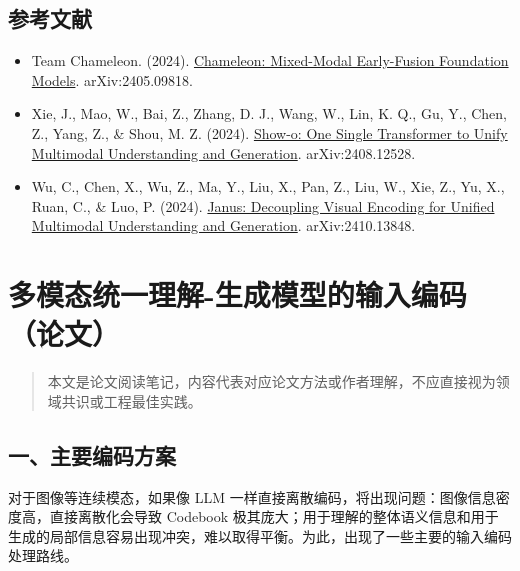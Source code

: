 \hypertarget{ux53c2ux8003ux6587ux732e-192}{%
\subsection{参考文献}\label{ux53c2ux8003ux6587ux732e-192}}

\begin{itemize}
\tightlist
\item
  Team Chameleon. (2024). \href{https://arxiv.org/abs/2405.09818}{Chameleon: Mixed-Modal Early-Fusion Foundation Models}. arXiv:2405.09818.
\item
  Xie, J., Mao, W., Bai, Z., Zhang, D. J., Wang, W., Lin, K. Q., Gu, Y., Chen, Z., Yang, Z., \& Shou, M. Z. (2024). \href{https://arxiv.org/abs/2408.12528}{Show-o: One Single Transformer to Unify Multimodal Understanding and Generation}. arXiv:2408.12528.
\item
  Wu, C., Chen, X., Wu, Z., Ma, Y., Liu, X., Pan, Z., Liu, W., Xie, Z., Yu, X., Ruan, C., \& Luo, P. (2024). \href{https://arxiv.org/abs/2410.13848}{Janus: Decoupling Visual Encoding for Unified Multimodal Understanding and Generation}. arXiv:2410.13848.
\end{itemize}

\clearpage

\hypertarget{ux591aux6a21ux6001ux7edfux4e00ux7406ux89e3-ux751fux6210ux6a21ux578bux7684ux8f93ux5165ux7f16ux7801ux8bbaux6587}{%
\section{多模态统一理解-生成模型的输入编码（论文）}\label{ux591aux6a21ux6001ux7edfux4e00ux7406ux89e3-ux751fux6210ux6a21ux578bux7684ux8f93ux5165ux7f16ux7801ux8bbaux6587}}

\begin{quote}
本文是论文阅读笔记，内容代表对应论文方法或作者理解，不应直接视为领域共识或工程最佳实践。
\end{quote}

\hypertarget{ux4e00ux4e3bux8981ux7f16ux7801ux65b9ux6848}{%
\subsection{一、主要编码方案}\label{ux4e00ux4e3bux8981ux7f16ux7801ux65b9ux6848}}

对于图像等连续模态，如果像 LLM 一样直接离散编码，将出现问题：图像信息密度高，直接离散化会导致 Codebook 极其庞大；用于理解的整体语义信息和用于生成的局部信息容易出现冲突，难以取得平衡。为此，出现了一些主要的输入编码处理路线。

